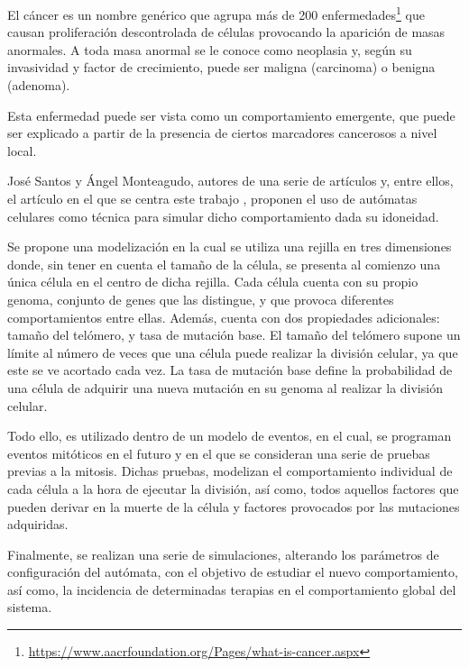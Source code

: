 El cáncer es un nombre genérico que agrupa más de 200 enfermedades\footnote{\url{https://www.aacrfoundation.org/Pages/what-is-cancer.aspx}}
que causan proliferación descontrolada de células provocando la aparición de masas anormales. A toda masa anormal se
le conoce como neoplasia y, según su invasividad y factor de crecimiento, puede ser maligna (carcinoma) o benigna (adenoma).

Esta enfermedad puede ser vista como un comportamiento emergente, que puede ser explicado a
partir de la presencia de ciertos marcadores cancerosos a nivel local.

José Santos y Ángel Monteagudo, autores de una serie de artículos \cite{jsantos-amonteagudo-2012} \cite{jsantos-amonteagudo-2013} \cite{jsantos-amonteagudo-2015} y, entre ellos, el artículo
en el que se centra este trabajo \cite{jsantos-amonteagudo-1-2014}, proponen el uso de autómatas
celulares como técnica para simular dicho comportamiento dada su idoneidad.

Se propone una modelización en la cual se utiliza una rejilla en tres dimensiones donde, sin
tener en cuenta el tamaño de la célula, se presenta al comienzo una única célula en el centro de dicha
rejilla. Cada célula cuenta con su propio genoma, conjunto de genes que las distingue, y que provoca
diferentes comportamientos entre ellas. Además, cuenta con dos propiedades adicionales:
tamaño del telómero, y tasa de mutación base. El tamaño del telómero supone un límite al
número de veces que una célula puede realizar la división celular, ya que este se ve acortado cada vez.
La tasa de mutación base define la probabilidad de una célula de adquirir una nueva mutación
en su genoma al realizar la división celular.

Todo ello, es utilizado dentro de un modelo de eventos, en el cual, se programan eventos mitóticos
en el futuro y en el que se consideran una serie de pruebas previas a la mitosis. Dichas pruebas,
modelizan el comportamiento individual de cada célula a la hora de ejecutar la división, así como,
todos aquellos factores que pueden derivar en la muerte de la célula y factores provocados
por las mutaciones adquiridas.

Finalmente, se realizan una serie de simulaciones, alterando los parámetros de configuración del
autómata, con el objetivo de estudiar el nuevo comportamiento, así como, la incidencia
de determinadas terapias en el comportamiento global del sistema.
